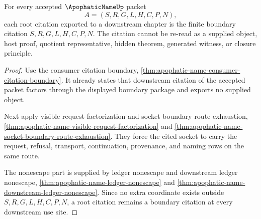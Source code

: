 \begin{theorem}
\label{thm:apophatic-name-root-citation-nonescape}
For every accepted $\ApophaticNameUp$ packet
$$
A=(S,R,G,L,H,C,P,N),
$$
each root citation exported to a downstream chapter is the finite boundary citation $S,R,G,L,H,C,P,N$. The citation cannot be re-read as a supplied object, host proof, quotient representative, hidden theorem, generated witness, or closure principle.
\end{theorem}
\begin{proof}
Use the consumer citation boundary, \autoref{thm:apophatic-name-consumer-citation-boundary}. It already states that downstream citation of the accepted packet factors through the displayed boundary package and exports no supplied object.

Next apply visible request factorization and socket boundary route exhaustion, \autoref{thm:apophatic-name-visible-request-factorization} and \autoref{thm:apophatic-name-socket-boundary-route-exhaustion}. They force the cited socket to carry the request, refusal, transport, continuation, provenance, and naming rows on the same route.

The nonescape part is supplied by ledger nonescape and downstream ledger nonescape, \autoref{thm:apophatic-name-ledger-nonescape} and \autoref{thm:apophatic-name-downstream-ledger-nonescape}. Since no extra coordinate exists outside $S,R,G,L,H,C,P,N$, a root citation remains a boundary citation at every downstream use site.
\end{proof}

